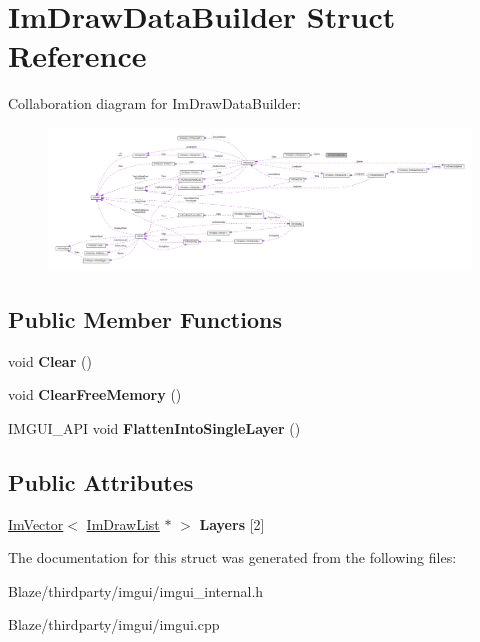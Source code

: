 \hypertarget{structImDrawDataBuilder}{}\section{Im\+Draw\+Data\+Builder Struct Reference}
\label{structImDrawDataBuilder}


Collaboration diagram for Im\+Draw\+Data\+Builder\+:\nopagebreak
\begin{figure}[H]
\begin{center}
\leavevmode
\includegraphics[width=350pt]{structImDrawDataBuilder__coll__graph}
\end{center}
\end{figure}
\subsection*{Public Member Functions}
\begin{DoxyCompactItemize}
\item 
\mbox{\label{structImDrawDataBuilder_a5306e78438b48a74f2d65d0e10d36d53}} 
void {\bfseries Clear} ()
\item 
\mbox{\label{structImDrawDataBuilder_a469040fce189f1225043171a3b58420d}} 
void {\bfseries Clear\+Free\+Memory} ()
\item 
\mbox{\label{structImDrawDataBuilder_a3893445f97c62e9755fa61e37b698487}} 
I\+M\+G\+U\+I\+\_\+\+A\+PI void {\bfseries Flatten\+Into\+Single\+Layer} ()
\end{DoxyCompactItemize}
\subsection*{Public Attributes}
\begin{DoxyCompactItemize}
\item 
\mbox{\label{structImDrawDataBuilder_a2d03f8c80dac68fc0e2565dd79307dea}} 
\hyperlink{structImVector}{Im\+Vector}$<$ \hyperlink{structImDrawList}{Im\+Draw\+List} $\ast$ $>$ {\bfseries Layers} \mbox{[}2\mbox{]}
\end{DoxyCompactItemize}


The documentation for this struct was generated from the following files\+:\begin{DoxyCompactItemize}
\item 
Blaze/thirdparty/imgui/imgui\+\_\+internal.\+h\item 
Blaze/thirdparty/imgui/imgui.\+cpp\end{DoxyCompactItemize}

